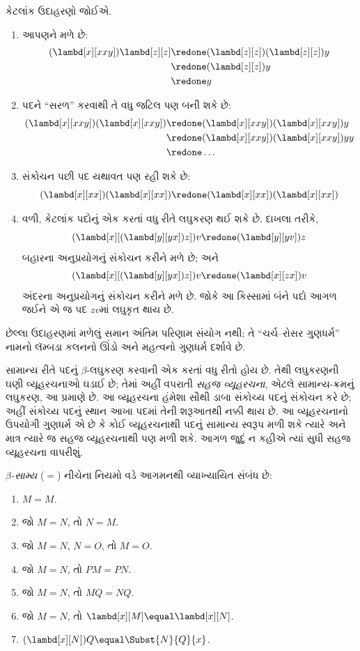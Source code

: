 \documentclass[../../../include/open-logic-section]{subfiles}
\begin{document}
કેટલાંક ઉદાહરણો જોઈએ.
\begin{enumerate}
\item આપણને મળે છે:
\begin{align*}
(\lambd[x][xxy]) \lambd[z][z] & \redone (\lambd[z][z])(\lambd[z][z]) y \\
& \redone (\lambd[z][z]) y \\
& \redone y
\end{align*}
\item પદને ``સરળ'' કરવાથી તે વધુ જટિલ પણ બની શકે છે:
\begin{align*}
(\lambd[x][xxy])(\lambd[x][xxy]) & \redone (\lambd[x][xxy])(\lambd[x][xxy])y \\
& \redone (\lambd[x][xxy])(\lambd[x][xxy])yy \\
& \redone \dots
\end{align*}
\item સંકોચન પછી પદ યથાવત પણ રહી શકે છે:
\[
(\lambd[x][xx])(\lambd[x][xx]) \redone (\lambd[x][xx])(\lambd[x][xx])
\]
\item વળી, કેટલાંક પદોનું એક કરતાં વધુ રીતે લઘુકરણ
  થઈ શકે છે. દાખલા તરીકે,
\[
(\lambd[x][(\lambd[y][yx]) z]) v \redone (\lambd[y][yv]) z
\]
બહારના અનુપ્રયોગનું સંકોચન કરીને મળે છે; અને
\[
(\lambd[x][(\lambd[y][yx]) z]) v \redone (\lambd[x][zx]) v
\]
અંદરના અનુપ્રયોગનું સંકોચન કરીને મળે છે. જોકે આ
કિસ્સામાં બંને પદો આગળ જઈને એ જ પદ $zv$માં લઘુકૃત
થાય છે.
\end{enumerate}

છેલ્લા ઉદાહરણમાં મળેલું સમાન અંતિમ પરિણામ સંયોગ નથી;
તે ``ચર્ચ--રોસર ગુણધર્મ'' નામનો લૅમ્બડા કલનનો ઊંડો
અને મહત્વનો ગુણધર્મ દર્શાવે છે.

\begin{digress}
  સામાન્ય રીતે પદનું $\beta$-લઘુકરણ કરવાની એક કરતાં
  વધુ રીતો હોય છે. તેથી લઘુકરણની ઘણી વ્યૂહરચનાઓ
  ઘડાઈ છે; તેમાં અહીં વપરાતી \emph{સહજ વ્યૂહરચના},
  એટલે સામાન્ય-ક્રમનું લઘુકરણ, આ પ્રમાણે છે.
  આ વ્યૂહરચના હંમેશા સૌથી ડાબા સંકોચ્ય પદનું સંકોચન કરે
  છે; અહીં સંકોચ્ય પદનું સ્થાન આખા પદમાં તેની શરૂઆતથી
  નક્કી થાય છે. આ વ્યૂહરચનાનો ઉપયોગી ગુણધર્મ એ છે કે
  કોઈ વ્યૂહરચનાથી પદનું સામાન્ય સ્વરૂપ મળી શકે ત્યારે
  અને માત્ર ત્યારે જ સહજ વ્યૂહરચનાથી પણ મળી શકે.
  આગળ જુદું ન કહીએ ત્યાં સુધી સહજ વ્યૂહરચના વાપરીશું.
\end{digress}

\begin{defn}
  \emph{$\beta$-સામ્ય} ($\equal$) નીચેના નિયમો વડે
  આગમનથી વ્યાખ્યાયિત સંબંધ છે:
  \begin{enumerate}
  \item $M \equal M$.
  \item જો $M \equal N$, તો $N \equal M$.
  \item જો $M \equal N$, $N \equal O$, તો $M \equal O$.
  \item જો $M \equal N$, તો $PM \equal PN$.
  \item જો $M \equal N$, તો $MQ \equal NQ$.
  \item જો $M \equal N$, તો $\lambd[x][M] \equal \lambd[x][N]$.
  \item $(\lambd[x][N])Q \equal \Subst{N}{Q}{x}$.
  \end{enumerate}
\end{defn}
\end{document}
